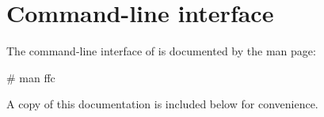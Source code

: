 \chapter{Command-line interface}

The command-line interface of \ffc{} is documented by the
\ffc{} man page:
\begin{code}
# man ffc
\end{code}

A copy of this documentation
is included below for convenience.

\scriptsize
\begin{alltt}

\end{alltt}
\normalsize
